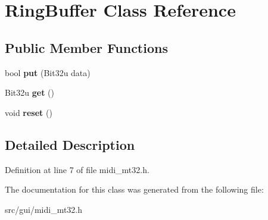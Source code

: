 \hypertarget{classRingBuffer}{\section{Ring\-Buffer Class Reference}
\label{classRingBuffer}
}
\subsection*{Public Member Functions}
\begin{DoxyCompactItemize}
\item 
\hypertarget{classRingBuffer_aacde8f228ca6de47df005a01709747e6}{bool {\bfseries put} (Bit32u data)}\label{classRingBuffer_aacde8f228ca6de47df005a01709747e6}

\item 
\hypertarget{classRingBuffer_af71400b4f58bfdb07bf211fcd4fc9890}{Bit32u {\bfseries get} ()}\label{classRingBuffer_af71400b4f58bfdb07bf211fcd4fc9890}

\item 
\hypertarget{classRingBuffer_a49f9bf7beeefbcdd4469dfa2d111e7dd}{void {\bfseries reset} ()}\label{classRingBuffer_a49f9bf7beeefbcdd4469dfa2d111e7dd}

\end{DoxyCompactItemize}


\subsection{Detailed Description}


Definition at line 7 of file midi\-\_\-mt32.\-h.



The documentation for this class was generated from the following file\-:\begin{DoxyCompactItemize}
\item 
src/gui/midi\-\_\-mt32.\-h\end{DoxyCompactItemize}
